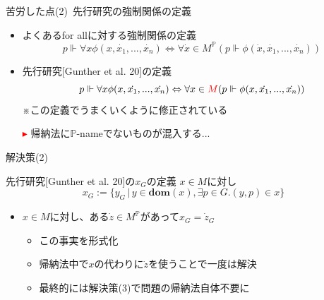 \documentclass[17pt,aspectratio=169]{beamer}
\newcommand{\Pbb}{\mathbb{P}}
\begin{document}
\begin{frame}{苦労した点(2)\, {\normalsize 先行研究の強制関係の定義}}
    \begin{itemize}[itemsep=9pt]
        \item よくあるfor allに対する強制関係の定義
              $$ p \Vdash \forall x \phi(x, \dot{x_1}, ..., \dot{x_n}) \Leftrightarrow \forall \dot{x} \in M^\Pbb(p \Vdash \phi(\dot{x}, \dot{x_1}, ..., \dot{x_n})) $$
        \item 先行研究{\small [Gunther et al. 20]}の定義
              $$ p \Vdash \forall x \phi(x, \dot{x_1}, ..., \dot{x_n}) \Leftrightarrow \forall x \in \textcolor{red}{M}(p \Vdash \phi(x, \dot{x_1}, ..., \dot{x_n})) $$
              {\small 
                \hspace{0.5cm}※この定義でうまくいくように修正されている
              }
        \item [\textcolor{red}{$\blacktriangleright$}] 帰納法に$\Pbb$-nameでないものが混入する...
    \end{itemize}
\end{frame}

\begin{frame}{解決策(2)}
    \begin{itembox}[l]{先行研究{\small [Gunther et al. 20]}の$x_G$の定義}
    {\small
        $x \in M$に対し
        \vspace{-5pt}
        $$x_G := \{ y_G \, | \, y \in \bm{\mathbf{dom}}(x), \exists p \in G. (y, p) \in x \}$$
    }
    \end{itembox}
    {\small 
    \begin{itemize}[itemsep=8pt]          
        \item $x \in M$に対し、ある$\dot{z} \in M^\Pbb$があって$x_G = \dot{z}_G$
            \vspace{3pt}
              {\small
              \begin{itemize}
                  \item この事実を形式化
                  \item 帰納法中で$x$の代わりに$\dot{z}$を使うことで一度は解決
                  \item 最終的には解決策(3)で問題の帰納法自体不要に
              \end{itemize}}
    \end{itemize}
    }
\end{frame}
\end{document}
